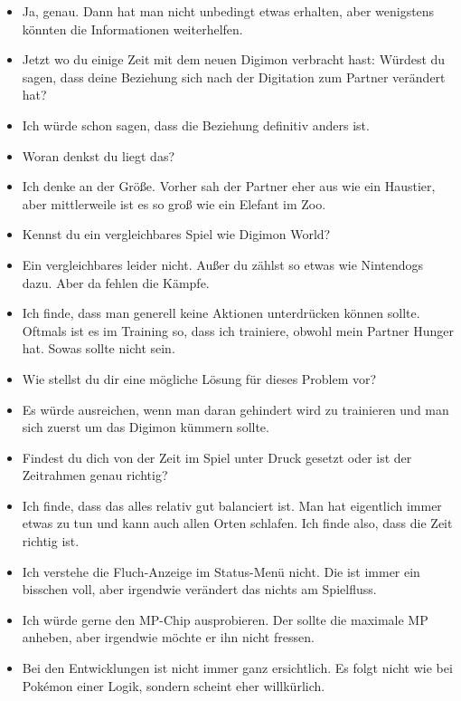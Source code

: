 {\begin{itemize}[]
    \item {} Ja, genau. Dann hat man nicht unbedingt etwas erhalten, aber wenigstens könnten die Informationen weiterhelfen.
    \item {} Jetzt wo du einige Zeit mit dem neuen Digimon verbracht hast: Würdest du sagen, dass deine Beziehung sich nach der Digitation zum Partner verändert hat?
    \item {} Ich würde schon sagen, dass die Beziehung definitiv anders ist.
    \item {} Woran denkst du liegt das?
    \item {} Ich denke an der Größe. Vorher sah der Partner eher aus wie ein Haustier, aber mittlerweile ist es so groß wie ein Elefant im Zoo. 
    \item {} Kennst du ein vergleichbares Spiel wie Digimon World?
    \item {} Ein vergleichbares leider nicht. Außer du zählst so etwas wie Nintendogs dazu. Aber da fehlen die Kämpfe.
    \item {} Ich finde, dass man generell keine Aktionen unterdrücken können sollte. Oftmals ist es im Training so, dass ich trainiere, obwohl mein Partner Hunger hat. Sowas sollte nicht sein. 
    \item {} Wie stellst du dir eine mögliche Lösung für dieses Problem vor?
    \item {} Es würde ausreichen, wenn man daran gehindert wird zu trainieren und man sich zuerst um das Digimon kümmern sollte. 
    \item {} Findest du dich von der Zeit im Spiel unter Druck gesetzt oder ist der Zeitrahmen genau richtig?
    \item {} Ich finde, dass das alles relativ gut balanciert ist. Man hat eigentlich immer etwas zu tun und kann auch allen Orten schlafen. Ich finde also, dass die Zeit richtig ist.
    \item {} Ich verstehe die \frq  Fluch\flq{}-Anzeige im Status-Menü nicht. Die ist immer ein bisschen voll, aber irgendwie verändert das nichts am Spielfluss.
    \item {} Ich würde gerne den MP-Chip ausprobieren. Der sollte die maximale MP anheben, aber irgendwie möchte er ihn nicht fressen. 
    \item {} Bei den Entwicklungen ist nicht immer ganz ersichtlich. Es folgt nicht wie bei Pokémon einer Logik, sondern scheint eher willkürlich.

\end{itemize}}
